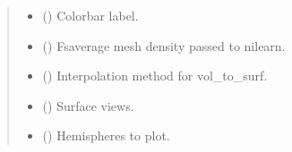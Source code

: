 \documentclass[letterpaper,10pt,english]{sphinxhowto}
\begin{document}
\begin{fulllineitems}
\begin{quote}
\begin{description}
\begin{itemize}
\item {} 
\sphinxAtStartPar
{} (\sphinxstyleliteralemphasis{\sphinxupquote{, }}) \textendash{} Colorbar label.

\item {} 
\sphinxAtStartPar
{} (\sphinxstyleliteralemphasis{\sphinxupquote{, }}) \textendash{} Fsaverage mesh density passed to nilearn.

\item {} 
\sphinxAtStartPar
{} (\sphinxstyleliteralemphasis{\sphinxupquote{, }}) \textendash{} Interpolation method for vol\_to\_surf.

\item {} 
\sphinxAtStartPar
{} (\sphinxstyleliteralemphasis{\sphinxupquote{, }}\sphinxstyleliteralemphasis{\sphinxupquote{(}}\sphinxstyleliteralemphasis{\sphinxupquote{, }}\sphinxstyleliteralemphasis{\sphinxupquote{, }}\sphinxstyleliteralemphasis{\sphinxupquote{, }}\sphinxstyleliteralemphasis{\sphinxupquote{)}}) \textendash{} Surface views.

\item {} 
\sphinxAtStartPar
{} (\sphinxstyleliteralemphasis{\sphinxupquote{, }}\sphinxstyleliteralemphasis{\sphinxupquote{(}}\sphinxstyleliteralemphasis{\sphinxupquote{, }}\sphinxstyleliteralemphasis{\sphinxupquote{, }}\sphinxstyleliteralemphasis{\sphinxupquote{, }}\sphinxstyleliteralemphasis{\sphinxupquote{)}}) \textendash{} Hemispheres to plot.


\end{itemize}
\end{description}
\end{quote}
\end{fulllineitems}
\end{document}
